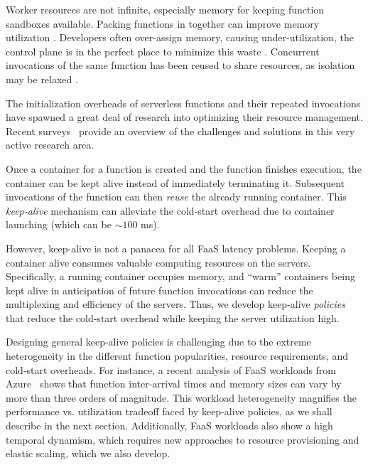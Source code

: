 Worker resources are not infinite, especially memory for keeping function sandboxes available.
Packing functions in together can improve memory utilization \cite{akhtar_cose_2020}.
Developers often over-assign memory, causing under-utilization, the control plane is in the perfect place to minimize this waste \cite{eismann2021sizeless, mvondo2021ofc}.
Concurrent invocations of the same function has been reused to share resources, as isolation may be relaxed \cite{stojkovic2023mxfaas}.

The initialization overheads of serverless functions and their repeated invocations have spawned a great deal of research into optimizing their resource management.
Recent surveys~\cite{faas-survey-jan-2022, raza2021sok, eismann2020serverless, hassan2021survey, mampage2021holistic} provide an overview of the challenges and solutions in this very active research area. 

Once a container for a function is created and the function finishes execution, the container can be kept alive instead of immediately terminating it. 
Subsequent invocations of the function can then \emph{reuse} the already running container.
This \emph{keep-alive} mechanism can alleviate the cold-start overhead due to container launching (which can be $\sim 100$ ms). %

However, keep-alive is not a panacea for all FaaS latency problems. 
Keeping a container alive consumes valuable computing resources on the servers. %
Specifically, a running container occupies memory, and ``warm'' containers being kept alive in anticipation of future function invocations can reduce the multiplexing and efficiency of the servers. 
Thus, we develop keep-alive \emph{policies} that reduce the cold-start overhead while keeping the server utilization high.

Designing general keep-alive policies is challenging due to the extreme heterogeneity in the different function popularities, resource requirements, and cold-start overheads.
For instance, a recent analysis of FaaS workloads from Azure~\cite{shahrad_serverless_2020} shows that function inter-arrival times and memory sizes can vary by more than three orders of magnitude. 
This workload heterogeneity magnifies the performance vs. utilization tradeoff faced by keep-alive policies, as we shall describe in the next section. 
Additionally, FaaS workloads also show a high temporal dynamism, which requires new approaches to resource provisioning and elastic scaling, which we also develop. 

